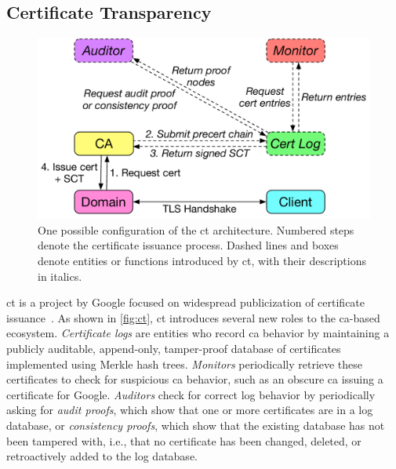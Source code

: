
\subsection{Certificate Transparency}
\label{sec:background:ct}

\begin{figure}
  \centering
  \includegraphics[width=\linewidth]{fig/ct}
  \caption{One possible configuration of the \ac{ct} architecture. Numbered
  steps denote the certificate issuance process. Dashed lines and boxes denote
entities or functions introduced by \ac{ct}, with their descriptions in
italics.}
  \label{fig:ct}
\end{figure}

\acf{ct} is a project by Google focused on widespread publicization of
certificate issuance~\cite{rfc6962}. As shown in \autoref{fig:ct}, \ac{ct}
introduces several new roles to the \ac{ca}-based ecosystem. \emph{Certificate
logs} are entities who record \ac{ca} behavior by maintaining a publicly
auditable, append-only, tamper-proof database of certificates implemented using
Merkle hash trees. \emph{Monitors} periodically retrieve these certificates to
check for suspicious \ac{ca} behavior, such as an obscure \ac{ca} issuing a
certificate for Google. \emph{Auditors} check for correct log behavior by
periodically asking for \emph{audit proofs}, which show that one or more
certificates are in a log database, or \emph{consistency proofs}, which show
that the existing database has not been tampered with, i.e., that no certificate
has been changed, deleted, or retroactively added to the log database.


